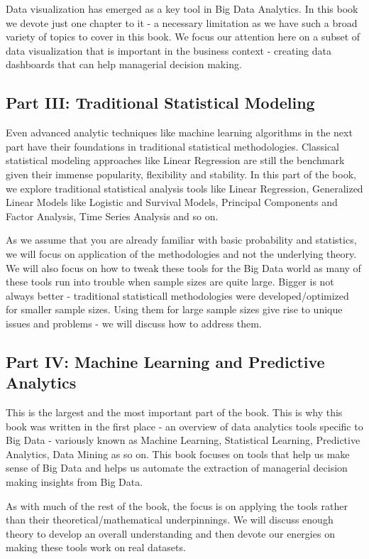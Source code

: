 \documentclass[11pt, letterpaper, twoside]{memoir}\usepackage{knitr}
\begin{document}
Data visualization has emerged as a key tool in Big Data Analytics. In this book we devote just one chapter to it - a necessary limitation as we have such a broad variety of topics to cover in this book. We focus our attention here on a subset of data visualization that is important in the business context - creating data dashboards that can help managerial decision making.   

\subsection{Part III: Traditional Statistical Modeling}

Even advanced analytic techniques like machine learning algorithms in the next part have their foundations in traditional statistical methodologies. Classical statistical modeling approaches like Linear Regression are still the benchmark given their immense popularity, flexibility and stability. In this part of the book, we explore traditional statistical analysis tools like Linear Regression, Generalized Linear Models like Logistic and Survival Models, Principal Components and Factor Analysis, Time Series Analysis and so on.

As we assume that you are already familiar with basic probability and statistics, we will focus on application of the methodologies and not the underlying theory. We will also focus on how to tweak these tools for the Big Data world as many of these tools run into trouble when sample sizes are quite large. Bigger is not always better - traditional statisticall methodologies were developed/optimized for smaller sample sizes. Using them for large sample sizes give rise to unique issues and problems - we will discuss how to address them.

\subsection{Part IV: Machine Learning and Predictive Analytics}

This is the largest and the most important part of the book. This is why this book was written in the first place - an overview of data analytics tools specific to Big Data - variously known as Machine Learning, Statistical Learning, Predictive Analytics, Data Mining as so on. This book focuses on tools that help us make sense of Big Data and helps us automate the extraction of managerial decision making insights from Big Data.

As with much of the rest of the book, the focus is on applying the tools rather than their theoretical/mathematical underpinnings. We will discuss enough theory to develop an overall understanding and then devote our energies on making these tools work on real datasets.
\end{document}
